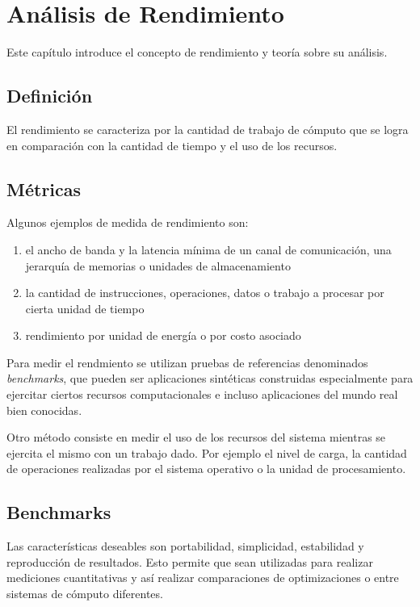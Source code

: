 \documentclass[a4paper]{report}
\begin{document}
\chapter{An\'alisis de Rendimiento}

Este cap\'itulo introduce el concepto de rendimiento y teor\'ia sobre su an\'alisis.

\section{Definici\'on}

El rendimiento se caracteriza por la cantidad de trabajo de c\'omputo que se logra
en comparaci\'on con la cantidad de tiempo y el uso de los recursos.

\section{M\'etricas}

Algunos ejemplos de medida de rendimiento son:

\begin{enumerate}
\item el ancho de banda y la latencia m\'inima de un canal de comunicaci\'on, una jerarqu\'ia de memorias o unidades
  de almacenamiento
\item la cantidad de instrucciones, operaciones, datos o trabajo a procesar por cierta unidad de tiempo
\item rendimiento por unidad de energ\'ia o por costo asociado
\end{enumerate}

Para medir el rendmiento se utilizan pruebas de referencias denominados {\em benchmarks}, que pueden ser aplicaciones
sint\'eticas construidas especialmente para ejercitar ciertos recursos computacionales e incluso aplicaciones del
 mundo real bien conocidas.

\bigskip

Otro m\'etodo consiste en medir el uso de los recursos del sistema mientras se ejercita el mismo con un trabajo dado.
Por ejemplo el nivel de carga, la cantidad de operaciones realizadas por el sistema operativo o la unidad de
procesamiento.

\section{Benchmarks}

Las caracter\'isticas deseables son portabilidad, simplicidad, estabilidad y reproducci\'on de resultados.
Esto permite que sean utilizadas para realizar mediciones cuantitativas y as\'i realizar comparaciones de
optimizaciones o entre sistemas de c\'omputo diferentes.
\end{document}
